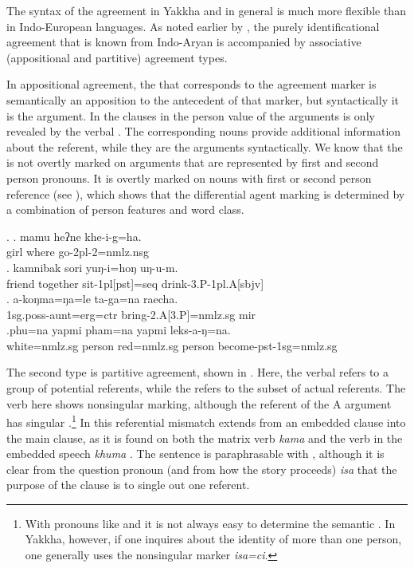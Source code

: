 The syntax of the agreement in Yakkha and  in general is much more flexible than in Indo-European languages. As noted earlier by \cite{Bickel2000On-the-syntax}, the purely identificational agreement that is known from Indo-Aryan is accompanied by associative (appositional and partitive) agreement types. 

In appositional agreement, the  that corresponds to the agreement marker is semantically an apposition to the antecedent of that marker, but syntactically it is the argument. In the clauses in \Next the person value of the arguments is only revealed by the verbal . The corresponding nouns provide additional information about the referent, while  they are the arguments syntactically. We know that the   is not overtly marked on arguments that are represented by first and second person pronouns. It is overtly marked on nouns with first or second person reference (see \Next[c]), which shows that the differential agent marking is determined by a combination of person features and word class.

\ex.  \ag. mamu heʔne khe-i-g=ha.\label{verb-infl-example}\\
		girl where go{\sc [pst]-2pl-2=nmlz.nsg}\\
	\bg.  kamnibak sori yuŋ-i=hoŋ uŋ-u-m.\\
		friend together sit{\sc -1pl[pst]=seq} drink{\sc -3.P-1pl.A[sbjv]}\\
	\bg. a-koŋma=ŋa=le   ta-ga=na           raecha.\\
		{\sc 1sg.poss-}aunt{\sc =erg=ctr} bring{\sc [pst]-2.A[3.P]=nmlz.sg} {\sc mir} \\
		 
		\bg.phu=na yapmi pham=na yapmi leks-a-ŋ=na.\\
		white{\sc =nmlz.sg} person red{\sc =nmlz.sg} person become{\sc -pst-1sg=nmlz.sg}\\
 
 
 The second type is partitive agreement, shown in \Next. Here, the verbal  refers to a group of potential referents, while the  refers to the subset of actual referents. The verb here shows nonsingular  marking, although the referent of the A argument has singular .\footnote{With pronouns like  and  it is not always easy to determine the semantic . In Yakkha, however, if one inquires about the identity of more than one person, one generally uses the nonsingular marker \emph{isa=ci}.}  In \Next[b] this referential mismatch extends from an embedded clause into the main clause, as it is found on both the matrix verb \emph{kama}  and the verb in the embedded speech \emph{khuma} . The sentence is paraphrasable with , although it is clear from the question pronoun (and from how the story proceeds) \emph{isa}  that the purpose of the clause is to single out one referent.
  
